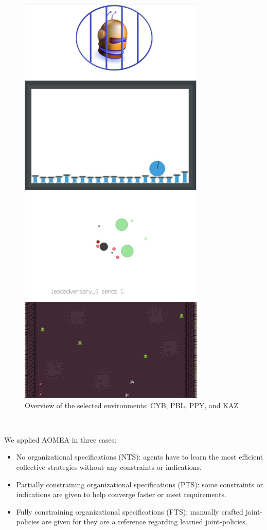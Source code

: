 \documentclass[runningheads]{llncs}
\begin{document}
\begin{minipage}[t]{0.35\textwidth}
    \vspace{-1cm}
    \begin{figure}[H] %
        \centering
        \includegraphics[width=0.6\linewidth]{figures/envs.png} %
        \caption{Overview of the selected environments: CYB, PBL, PPY, and KAZ}
        \label{fig:simulated_environments}
    \end{figure}
\end{minipage}

\

\noindent We applied AOMEA in three cases:
\begin{itemize}
    \item No organizational specifications (NTS): agents have to learn the most efficient collective strategies without any constraints or indications.
    \item Partially constraining organizational specifications (PTS): some constraints or indications are given to help converge faster or meet requirements.
    \item Fully constraining organizational specifications (FTS): manually crafted joint-policies are given for they are a reference regarding learned joint-policies.
\end{itemize}
\end{document}
